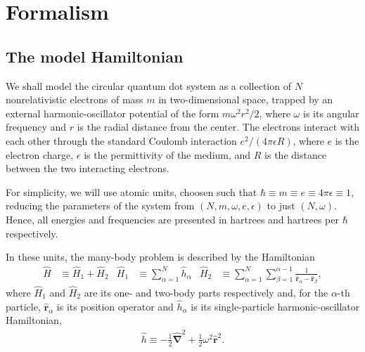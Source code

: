 \documentclass[aip, jcp, 12pt]{revtex4-1}
\begin{document}
\section{Formalism}
\label{sec:formalism}

\subsection{The model Hamiltonian}
\label{subsec:modelHamiltonian}

We shall model the circular quantum dot system as a collection of $N$ nonrelativistic electrons of mass $m$ in two-dimensional space, trapped by an external harmonic-oscillator potential of the form $m \omega^2r^2 / 2$, where $\omega$ is its angular frequency and $r$ is the radial distance from the center.  The electrons interact with each other through the standard Coulomb interaction $e^2 / (4 \pi \epsilon R)$, where $e$ is the electron charge, $\epsilon$ is the permittivity of the medium, and $R$ is the distance between the two interacting electrons.

For simplicity, we will use atomic units, choosen such that $\hbar \equiv m \equiv e \equiv 4 \pi \epsilon \equiv 1$, reducing the parameters of the system from $(N, m, \omega, e, \epsilon)$ to just $(N, \omega)$.  Hence, all energies and frequencies are presented in hartrees and hartrees per $\hbar$ respectively.

In these units, the many-body problem is described by the Hamiltonian
\begin{align} \label{eq:fullhamiltonian}
  \hat H &\equiv \hat{H}_1 + \hat{H}_2 & \hat{H}_1 &\equiv \sum_{\alpha = 1}^N \hat{h}_\alpha & \hat{H}_2 &\equiv \sum_{\alpha = 1}^N \sum_{\beta = 1}^{\alpha - 1} \frac{1}{\hat{\bm r}_\alpha - \hat{\bm r}_\beta},
\end{align}
where $\hat{H}_1$ and $\hat{H}_2$ are its one- and two-body parts respectively and, for the $\alpha$-th particle, $\hat{\bm r}_\alpha$ is its position operator and  $\hat{h}_\alpha$ is its single-particle harmonic-oscillator Hamiltonian,
\begin{align*}
  \hat{h} \equiv -\frac{1}{2} \hat{\bm{\nabla}}^2 + \frac{1}{2} \omega^2 \hat{\bm{r}}^2.
\end{align*}
\end{document}
